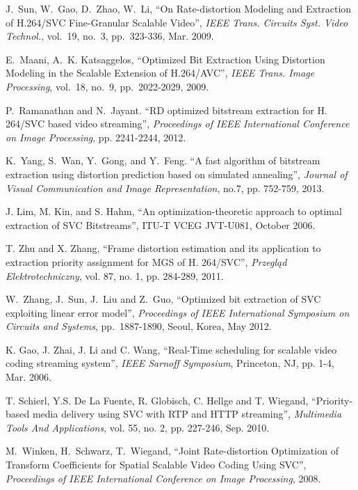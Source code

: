 \documentclass[journal]{IEEEtran}
\begin{document}
\begin{thebibliography}{1}
J.~Sun, W.~Gao, D.~Zhao, W.~Li, ``On Rate-distortion Modeling and Extraction of H.264/SVC Fine-Granular Scalable Video'', {\em IEEE Trans. Circuits Syst. Video Technol.}, vol.~19, no.~3, pp.~323-336, Mar. 2009.

E.~Maani, A.~K. Katsaggelos, ``Optimized Bit Extraction Using Distortion Modeling in the Scalable Extension of H.264/AVC'', {\em IEEE Trans. Image Processing}, vol.~18, no.~9, pp.~2022-2029, 2009.

P.~Ramanathan and N.~Jayant. ``RD optimized bitstream extraction for H. 264/SVC based video streaming'', {\em Proceedings of IEEE International Conference on Image Processing}, pp. 2241-2244, 2012.

K.~Yang, S.~Wan, Y.~Gong, and Y.~Feng. ``A fast algorithm of bitstream extraction using distortion prediction based on simulated annealing'', {\em Journal of Visual Communication and Image Representation}, no.7, pp. 752-759, 2013.

J. Lim, M. Kin, and S. Hahm, ``An optimization-theoretic approach to optimal extraction of SVC Bitstreams'', ITU-T VCEG
JVT-U081, October 2006.

T. Zhu and X. Zhang, ``Frame distortion estimation and its application to extraction priority assignment for MGS of H. 264/SVC'', {\em Przegląd Elektrotechniczny}, vol. 87, no. 1, pp. 284-289, 2011.

W.~Zhang, J.~Sun, J.~Liu and Z.~Guo, ``Optimized bit extraction of SVC exploiting linear error model'', {\em Proceedings of IEEE International Symposium on Circuits and Systems}, pp.~1887-1890, Seoul, Korea, May 2012.

K. Gao, J. Zhai, J. Li and C. Wang, ``Real-Time scheduling for scalable video coding streaming system'', {\em IEEE Sarnoff Symposium}, Princeton, NJ, pp. 1-4, Mar. 2006.

T. Schierl, Y.S. De La Fuente, R. Globisch, C. Hellge and T. Wiegand, ``Priority-based media delivery using SVC with RTP and HTTP streaming'', {\em Multimedia Tools And Applications}, vol. 55, no. 2, pp. 227-246, Sep. 2010.

M.~Winken, H.~Schwarz, T.~Wiegand, ``Joint Rate-distortion Optimization of Transform Coefficients for Spatial Scalable Video Coding Using SVC'', {\em Proceedings of IEEE International Conference on Image Processing}, 2008.


\end{thebibliography}
\end{document}
